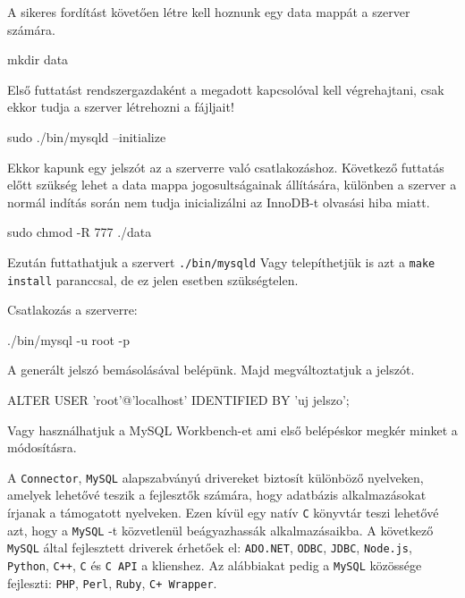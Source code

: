 A sikeres fordítást követően létre kell hoznunk egy data mappát a szerver számára.
\begin{python}
 mkdir data
\end{python}
Első futtatást rendszergazdaként a megadott kapcsolóval kell végrehajtani, csak ekkor tudja a szerver létrehozni a fájljait!
\begin{python}
 sudo ./bin/mysqld --initialize
\end{python}
Ekkor kapunk egy jelszót az a szerverre való csatlakozáshoz. Következő futtatás előtt szükség lehet a data mappa jogosultságainak állítására, különben a szerver a normál indítás során nem tudja inicializálni az InnoDB-t olvasási hiba miatt.
\begin{python}
 sudo chmod -R 777 ./data
\end{python}
Ezután futtathatjuk a szervert
\texttt{./bin/mysqld}
Vagy telepíthetjük is azt a \texttt{make install} paranccsal, de ez jelen esetben szükségtelen.



Csatlakozás a szerverre:
\begin{python}
 ./bin/mysql -u root -p
\end{python}
A generált jelszó bemásolásával belépünk. Majd megváltoztatjuk a jelszót.
\begin{python}
ALTER USER 'root'@'localhost' IDENTIFIED BY 'uj jelszo';
\end{python}
Vagy használhatjuk a MySQL Workbench-et ami első belépéskor megkér minket a módosításra.



A \texttt{Connector}, \texttt{MySQL} alapszabványú drivereket biztosít különböző nyelveken, amelyek lehetővé teszik a fejlesztők számára, hogy adatbázis alkalmazásokat írjanak a támogatott nyelveken. Ezen kívül egy natív \texttt{C} könyvtár teszi lehetővé azt, hogy a \texttt{MySQL} -t közvetlenül beágyazhassák alkalmazásaikba. \newline
A következő \texttt{MySQL} által fejlesztett driverek érhetőek el: \newline
\texttt{ADO.NET}, \texttt{ODBC}, \texttt{JDBC}, \texttt{Node.js}, \texttt{Python}, \texttt{C++}, \texttt{C} és \texttt{C API} a klienshez. \newline
Az alábbiakat pedig a \texttt{MySQL} közössége fejleszti:\newline
\texttt{PHP}, \texttt{Perl}, \texttt{Ruby}, \texttt{C+ Wrapper}. \cite{connector}

